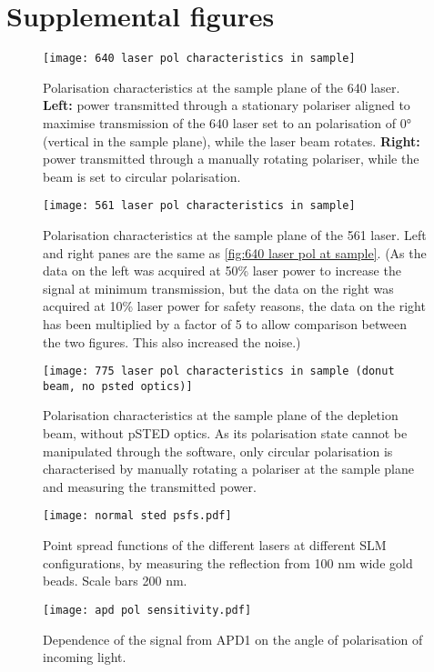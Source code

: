 \section{Supplemental figures}

\begin{figure}[h]
	\centering
	\texttt{[image: 640 laser pol characteristics in sample]}
	\caption{
		Polarisation characteristics at the sample plane of the 640 laser. \textbf{Left:} power transmitted through a stationary polariser aligned to maximise transmission of the 640 laser set to an polarisation of 0° (vertical in the sample plane), while the laser beam rotates. \textbf{Right:} power transmitted through a manually rotating polariser, while the beam is set to circular polarisation.
	}
	\label{fig:640 laser pol at sample}
\end{figure}

\begin{figure}[h]
	\centering
	\texttt{[image: 561 laser pol characteristics in sample]}
	\caption{
		Polarisation characteristics at the sample plane of the 561 laser. Left and right panes are the same as \autoref{fig:640 laser pol at sample}. (As the data on the left was acquired at 50\% laser power to increase the signal at minimum transmission, but the data on the right was acquired at 10\% laser power for safety reasons, the data on the right has been multiplied by a factor of 5 to allow comparison between the two figures. This also increased the noise.)
	}
	\label{fig:561 laser pol at sample}
\end{figure}

\begin{figure}[h]
	\centering
	\texttt{[image: 775 laser pol characteristics in sample (donut beam, no psted optics)]}
	\caption{
		Polarisation characteristics at the sample plane of the depletion beam, without pSTED optics. As its polarisation state cannot be manipulated through the software, only circular polarisation is characterised by manually rotating a polariser at the sample plane and measuring the transmitted power.
	}
	\label{fig:775 laser pol at sample}
\end{figure}

\begin{figure}[h]
	\centering
	\texttt{[image: normal sted psfs.pdf]}
	\caption{
		Point spread functions of the different lasers at different SLM configurations, by measuring the reflection from 100 nm wide gold beads. Scale bars 200 nm. 
	}
	\label{fig:normal psfs}
\end{figure}

\begin{figure}[h]
	\centering
	\texttt{[image: apd pol sensitivity.pdf]}
	\caption{Dependence of the signal from APD1 on the angle of polarisation of incoming light.}
	\label{fig:apd pol sensitivity}
\end{figure}